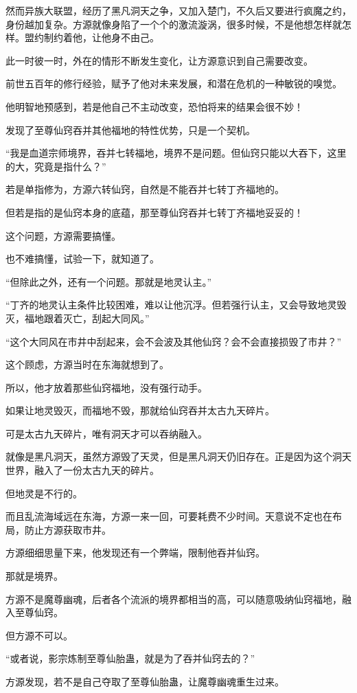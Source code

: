 \begin{this_body}
然而异族大联盟，经历了黑凡洞天之争，又加入楚门，不久后又要进行疯魔之约，身份越加复杂。方源就像身陷了一个个的激流漩涡，很多时候，不是他想怎样就怎样。盟约制约着他，让他身不由己。

此一时彼一时，外在的情形不断发生变化，让方源意识到自己需要改变。

前世五百年的修行经验，赋予了他对未来发展，和潜在危机的一种敏锐的嗅觉。

他明智地预感到，若是他自己不主动改变，恐怕将来的结果会很不妙！

发现了至尊仙窍吞并其他福地的特性优势，只是一个契机。

“我是血道宗师境界，吞并七转福地，境界不是问题。但仙窍只能以大吞下，这里的大，究竟是指什么？”

若是单指修为，方源六转仙窍，自然是不能吞并七转丁齐福地的。

但若是指的是仙窍本身的底蕴，那至尊仙窍吞并七转丁齐福地妥妥的！

这个问题，方源需要搞懂。

也不难搞懂，试验一下，就知道了。

“但除此之外，还有一个问题。那就是地灵认主。”

“丁齐的地灵认主条件比较困难，难以让他沉浮。但若强行认主，又会导致地灵毁灭，福地跟着灭亡，刮起大同风。”

“这个大同风在市井中刮起来，会不会波及其他仙窍？会不会直接损毁了市井？”

这个顾虑，方源当时在东海就想到了。

所以，他才放着那些仙窍福地，没有强行动手。

如果让地灵毁灭，而福地不毁，那就给仙窍吞并太古九天碎片。

可是太古九天碎片，唯有洞天才可以吞纳融入。

就像是黑凡洞天，虽然方源毁了天灵，但是黑凡洞天仍旧存在。正是因为这个洞天世界，融入了一份太古九天的碎片。

但地灵是不行的。

而且乱流海域远在东海，方源一来一回，可要耗费不少时间。天意说不定也在布局，防止方源获取市井。

方源细细思量下来，他发现还有一个弊端，限制他吞并仙窍。

那就是境界。

方源不是魔尊幽魂，后者各个流派的境界都相当的高，可以随意吸纳仙窍福地，融入至尊仙窍。

但方源不可以。

“或者说，影宗炼制至尊仙胎蛊，就是为了吞并仙窍去的？”

方源发现，若不是自己夺取了至尊仙胎蛊，让魔尊幽魂重生过来。


\end{this_body}
